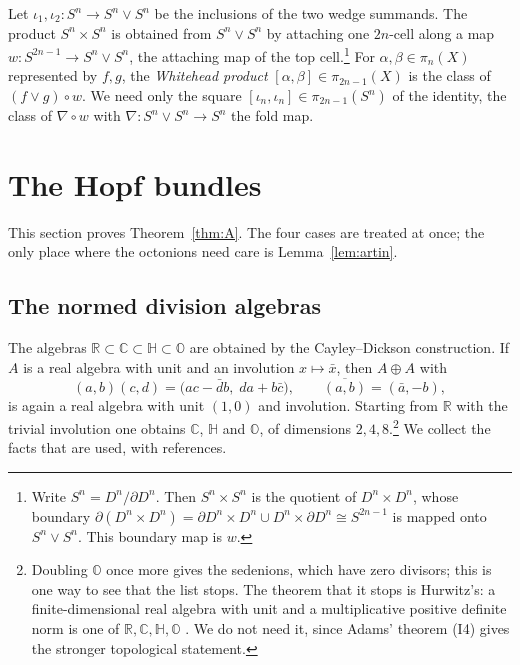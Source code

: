 \documentclass[11pt]{amsart}
\numberwithin{equation}{section}
\theoremstyle{plain}
\theoremstyle{definition}
\theoremstyle{remark}
\newcommand{\R}{\mathbb{R}}
\newcommand{\C}{\mathbb{C}}
\newcommand{\Hq}{\mathbb{H}}
\newcommand{\Oc}{\mathbb{O}}
\begin{document}
Let $\iota_1,\iota_2\colon S^n\to S^n\vee S^n$ be the inclusions of the two wedge summands. The product $S^n\times S^n$ is obtained from $S^n\vee S^n$ by attaching one $2n$-cell along a map $w\colon S^{2n-1}\to S^n\vee S^n$, the attaching map of the top cell.\footnote{Write $S^n=D^n/\partial D^n$. Then $S^n\times S^n$ is the quotient of $D^n\times D^n$, whose boundary $\partial(D^n\times D^n)=\partial D^n\times D^n\cup D^n\times\partial D^n\cong S^{2n-1}$ is mapped onto $S^n\vee S^n$. This boundary map is $w$.} For $\alpha,\beta\in\pi_n(X)$ represented by $f,g$, the \emph{Whitehead product} $[\alpha,\beta]\in\pi_{2n-1}(X)$ is the class of $(f\vee g)\circ w$. We need only the square $[\iota_n,\iota_n]\in\pi_{2n-1}(S^n)$ of the identity, the class of $\nabla\circ w$ with $\nabla\colon S^n\vee S^n\to S^n$ the fold map.
\section{The Hopf bundles}\label{ch:hopf}

This section proves Theorem~\ref{thm:A}. The four cases are treated at once; the only place where the octonions need care is Lemma~\ref{lem:artin}.

\subsection{The normed division algebras}\label{sec:algebras}

The algebras $\R\subset\C\subset\Hq\subset\Oc$ are obtained by the Cayley--Dickson construction. If $A$ is a real algebra with unit and an involution $x\mapsto\bar x$, then $A\oplus A$ with
\begin{equation}\label{eq:cd}
(a,b)(c,d)=\bigl(ac-\bar d b,\;da+b\bar c\bigr),\qquad \overline{(a,b)}=(\bar a,-b),
\end{equation}
is again a real algebra with unit $(1,0)$ and involution. Starting from $\R$ with the trivial involution one obtains $\C$, $\Hq$ and $\Oc$, of dimensions $2,4,8$.\footnote{Doubling $\Oc$ once more gives the sedenions, which have zero divisors; this is one way to see that the list stops. The theorem that it stops is Hurwitz's: a finite-dimensional real algebra with unit and a multiplicative positive definite norm is one of $\R,\C,\Hq,\Oc$ \cite[Section~2]{Bae02}. We do not need it, since Adams' theorem (I4) gives the stronger topological statement.} We collect the facts that are used, with references.
\end{document}
